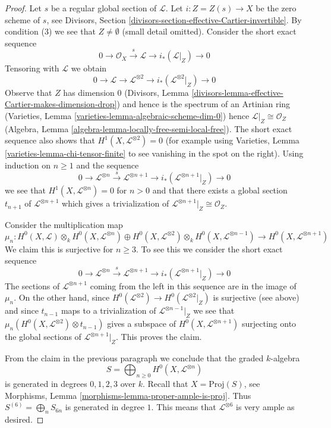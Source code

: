 \documentclass{stacks-project}
\theoremstyle{plain}
\theoremstyle{definition}
\theoremstyle{remark}
\numberwithin{equation}{subsection}
\begin{document}
\begin{proof}
Let $s$ be a regular global section of $\mathcal{L}$. Let
$i : Z = Z(s) \to X$ be the zero scheme of $s$, see
Divisors, Section \ref{divisors-section-effective-Cartier-invertible}.
By condition (3) we see that $Z \not = \emptyset$ (small detail omitted).
Consider the short exact sequence
$$
0 \to \mathcal{O}_X \xrightarrow{s} \mathcal{L} \to
i_*(\mathcal{L}|_Z) \to 0
$$
Tensoring with $\mathcal{L}$ we obtain
$$
0 \to \mathcal{L} \to \mathcal{L}^{\otimes 2} \to
i_*(\mathcal{L}^{\otimes 2}|_Z) \to 0
$$
Observe that $Z$ has dimension $0$
(Divisors, Lemma \ref{divisors-lemma-effective-Cartier-makes-dimension-drop})
and hence is the spectrum of an Artinian ring
(Varieties, Lemma \ref{varieties-lemma-algebraic-scheme-dim-0})
hence $\mathcal{L}|_Z \cong \mathcal{O}_Z$
(Algebra, Lemma \ref{algebra-lemma-locally-free-semi-local-free}).
The short exact sequence also shows that
$H^1(X, \mathcal{L}^{\otimes 2}) = 0$ (for example using
Varieties, Lemma \ref{varieties-lemma-chi-tensor-finite}
to see vanishing in the spot on the right). Using induction
on $n \geq 1$ and the sequence
$$
0 \to \mathcal{L}^{\otimes n} \xrightarrow{s}
\mathcal{L}^{\otimes n + 1} \to
i_*(\mathcal{L}^{\otimes n + 1}|_Z) \to 0
$$
we see that $H^1(X, \mathcal{L}^{\otimes n}) = 0$ for $n > 0$
and that there exists a global section $t_{n + 1}$
of $\mathcal{L}^{\otimes n + 1}$ which gives a trivialization of
$\mathcal{L}^{\otimes n + 1}|_Z \cong \mathcal{O}_Z$.

\medskip\noindent
Consider the multiplication map
$$
\mu_n :
H^0(X, \mathcal{L}) \otimes_k H^0(X, \mathcal{L}^{\otimes n})
\oplus
H^0(X, \mathcal{L}^{\otimes 2}) \otimes_k H^0(X, \mathcal{L}^{\otimes n - 1})
\longrightarrow
H^0(X, \mathcal{L}^{\otimes n + 1})
$$
We claim this is surjective for $n \geq 3$.
To see this we consider the short exact sequence
$$
0 \to \mathcal{L}^{\otimes n} \xrightarrow{s}
\mathcal{L}^{\otimes n + 1} \to i_*(\mathcal{L}^{\otimes n + 1}|_Z) \to 0
$$
The sections of $\mathcal{L}^{\otimes n + 1}$ coming from the left in this
sequence are in the image of $\mu_n$. On the other hand, since
$H^0(\mathcal{L}^{\otimes 2}) \to H^0(\mathcal{L}^{\otimes 2}|_Z)$
is surjective (see above) and since $t_{n - 1}$ maps to a trivialization of
$\mathcal{L}^{\otimes n - 1}|_Z$
we see that $\mu_n(H^0(X, \mathcal{L}^{\otimes 2}) \otimes t_{n - 1})$
gives a subspace
of $H^0(X, \mathcal{L}^{\otimes n + 1})$ surjecting onto the global sections of
$\mathcal{L}^{\otimes n + 1}|_Z$. This proves the claim.

\medskip\noindent
From the claim in the previous paragraph we conclude
that the graded $k$-algebra
$$
S = \bigoplus\nolimits_{n \geq 0} H^0(X, \mathcal{L}^{\otimes n})
$$
is generated in degrees $0, 1, 2, 3$ over $k$.
Recall that $X = \text{Proj}(S)$, see
Morphisms, Lemma \ref{morphisms-lemma-proper-ample-is-proj}.
Thus $S^{(6)} = \bigoplus_{n} S_{6n}$ is generated in degree $1$.
This means that $\mathcal{L}^{\otimes 6}$ is very ample as desired.
\end{proof}
\end{document}
